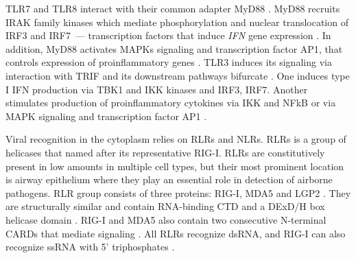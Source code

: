 		
				
		TLR7 and TLR8 interact with their common adapter MyD88 \parencite{Medzhitov1998}. MyD88 recruits IRAK family kinases which mediate phosphorylation and nuclear translocation of \gls{IRF}3 and \gls{IRF}7~--- transcription factors that induce \textit{\gls{IFN}} gene expression \parencite{Burns2003, Honda2005a}. In addition, MyD88 activates \glspl{MAPK} signaling and transcription factor \gls{AP1}, that controls expression of proinflammatory genes \parencite{Kawai2007}. TLR3 induces its signaling via interaction with \gls{TRIF} and its downstream pathways bifurcate \parencite{Guillot2005, Kumar2009}. One induces type I \gls{IFN} production via TBK1 and \gls{IKK} kinases and \gls{IRF}3, \gls{IRF}7. Another stimulates production of proinflammatory cytokines via \gls{IKK} and \gls{NFkB} or via \gls{MAPK} signaling and transcription factor \gls{AP1} \parencite{Guillot2005, Vercammen2008}.  
		 
		Viral recognition in the cytoplasm relies on \glspl{RLR} and \glspl{NLR}.
		\glspl{RLR} is a group of helicases that named after its representative \gls{RIG-I}. \glspl{RLR} are constitutively present in low amounts in multiple cell types, but their most prominent location is airway epithelium \parencite{Bogefors2011} where they play an essential role in detection of airborne pathogens. \gls{RLR} group consists of three proteins: \gls{RIG-I}, \gls{MDA5} and \gls{LGP2} \parencite{Kang2004, Yoneyama2004, Yoneyama2005}. They are structurally similar and contain RNA-binding \gls{CTD} and a DExD/H box helicase domain \parencite{Cui2008, Takahasi2009}. \gls{RIG-I} and \gls{MDA5} also contain two consecutive N-terminal \glspl{CARD} that mediate signaling \parencite{Yoneyama2004, Kang2004}. All \glspl{RLR} recognize dsRNA, and \gls{RIG-I} can also recognize ssRNA with 5' triphosphates \parencite{Cui2008}. 
		
